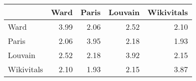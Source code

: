 \begin{tabular}{lrrrr}
\toprule
{} &  Ward &  Paris &  Louvain &  Wikivitals \\
\midrule
Ward       &  3.99 &   2.06 &     2.52 &        2.10 \\
Paris      &  2.06 &   3.95 &     2.18 &        1.93 \\
Louvain    &  2.52 &   2.18 &     3.92 &        2.15 \\
Wikivitals &  2.10 &   1.93 &     2.15 &        3.87 \\
\bottomrule
\end{tabular}

